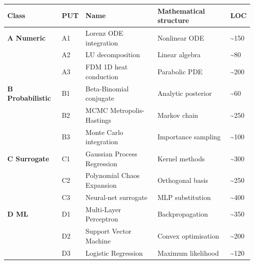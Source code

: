 \documentclass[review,12pt,authoryear]{elsarticle}
\newcounter{none}                   %
\begin{document}
{\def\LTcaptype{none} %
\begin{longtable}[]{@{}
  >{\raggedright\arraybackslash}p{}
  >{\raggedright\arraybackslash}p{}
  >{\raggedright\arraybackslash}p{}
  >{\raggedright\arraybackslash}p{}
  >{\raggedright\arraybackslash}p{}@{}}
\toprule\noalign{}
\begin{minipage}[b]{\linewidth}\raggedright
Class
\end{minipage} & \begin{minipage}[b]{\linewidth}\raggedright
PUT
\end{minipage} & \begin{minipage}[b]{\linewidth}\raggedright
Name
\end{minipage} & \begin{minipage}[b]{\linewidth}\raggedright
Mathematical structure
\end{minipage} & \begin{minipage}[b]{\linewidth}\raggedright
LOC
\end{minipage} \\
\midrule\noalign{}
\endhead
\bottomrule\noalign{}
\endlastfoot
\textbf{A Numeric} & A1 & Lorenz ODE integration & Nonlinear ODE &
\textasciitilde150 \\
& A2 & LU decomposition & Linear algebra & \textasciitilde80 \\
& A3 & FDM 1D heat conduction & Parabolic PDE & \textasciitilde200 \\
\textbf{B Probabilistic} & B1 & Beta-Binomial conjugate & Analytic
posterior & \textasciitilde60 \\
& B2 & MCMC Metropolis-Hastings & Markov chain & \textasciitilde250 \\
& B3 & Monte Carlo integration & Importance sampling &
\textasciitilde100 \\
\textbf{C Surrogate} & C1 & Gaussian Process Regression & Kernel methods
& \textasciitilde300 \\
& C2 & Polynomial Chaos Expansion & Orthogonal basis &
\textasciitilde250 \\
& C3 & Neural-net surrogate & MLP substitution & \textasciitilde400 \\
\textbf{D ML} & D1 & Multi-Layer Perceptron & Backpropagation &
\textasciitilde350 \\
& D2 & Support Vector Machine & Convex optimisation &
\textasciitilde200 \\
& D3 & Logistic Regression & Maximum likelihood & \textasciitilde120 \\
\end{longtable}
}
\end{document}
